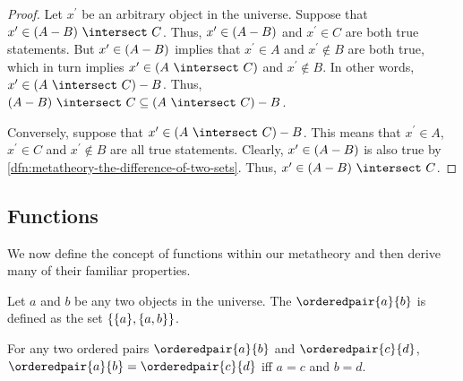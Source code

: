 \begin{proof}
    Let \( x^{\prime} \) be an arbitrary object in the universe.
    Suppose that \( x^{\prime} \in \mleft( A - B \mright) \,\,{\intersect}\,\, C \).
    Thus, \( x^{\prime} \in \mleft( A - B \mright) \) and \( x^{\prime} \in C \) are both true statements.
    But \( x^{\prime} \in \mleft( A - B \mright) \) implies that \( x^{\prime} \in A \) and \( x^{\prime} \notin B \) are both true,
    which in turn implies \( x^{\prime} \in \mleft( A \,\,{\intersect}\,\, C \mright) \) and \( x^{\prime} \notin B \).
    In other words, \( x^{\prime} \in \mleft( A \,\,{\intersect}\,\, C \mright) - B \).
    Thus, \( \mleft( A - B \mright) \,\,{\intersect}\,\, C \subseteq \mleft( A \,\,{\intersect}\,\, C \mright) - B \).

    \vspace{0.3cm}
    \noindent
    Conversely, suppose that \( x^{\prime} \in \mleft( A \,\,{\intersect}\,\, C \mright) - B \).
    This means that \( x^{\prime} \in A \), \( x^{\prime} \in C \) and \( x^{\prime} \notin B \) are all true statements.
    Clearly, \( x^{\prime} \in \mleft( A - B \mright) \) is also true by \cref{dfn:metatheory-the-difference-of-two-sets}.
    Thus, \( x^{\prime} \in \mleft( A - B \mright) \,\,{\intersect}\,\, C \).
\end{proof}

\subsection{Functions}
We now define the concept of functions within our metatheory and then derive many of their familiar properties.

\begin{dfn}
     \label{dfn:metatheory-ordered-pair-kuratowski}
    Let \( a \) and \( b \) be any two objects in the universe.
    The  \( \orderedpair{a}{b} \) is defined as the set
    \( \mleft\{ \mleft\{ a \mright\}, \mleft\{ a, b \mright\} \mright\} \).
\end{dfn}

\begin{thm}
     \label{thm:metatheory-equality-of-ordered-pairs}
    For any two ordered pairs \( \orderedpair{a}{b} \) and \( \orderedpair{c}{d} \),
    \( \orderedpair{a}{b} = \orderedpair{c}{d} \) iff \( a = c \) and \( b = d \).
\end{thm}

